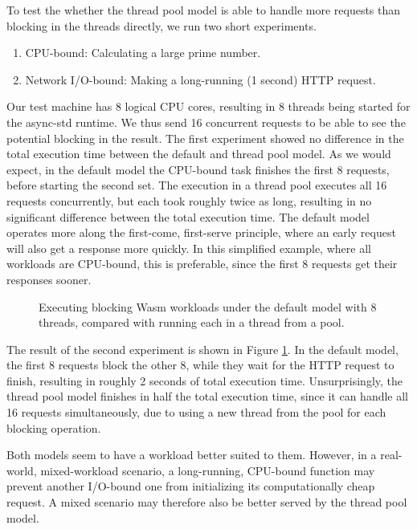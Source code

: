 To test the whether the thread pool model is able to handle more requests than blocking in the threads directly, we run two short experiments.

\begin{enumerate}
    \item CPU-bound: Calculating a large prime number.
    \item Network I/O-bound: Making a long-running (1 second) HTTP request.
\end{enumerate}

Our test machine has 8 logical CPU cores, resulting in 8 threads being started for the async-std runtime. We thus send 16 concurrent requests to be able to see the potential blocking in the result. The first experiment showed no difference in the total execution time between the default and thread pool model. As we would expect, in the default model the CPU-bound task finishes the first 8 requests, before starting the second set. The execution in a thread pool executes all 16 requests concurrently, but each took roughly twice as long, resulting in no significant difference between the total execution time. The default model operates more along the first-come, first-serve principle, where an early request will also get a response more quickly. In this simplified example, where all workloads are CPU-bound, this is preferable, since the first 8 requests get their responses sooner.

\begin{figure}[ht!]
    \begin{center}
        
    \end{center}
    \caption{Executing blocking Wasm workloads under the  default model with 8 threads, compared with running each in a thread from a pool.}
    \label{fig:default_vs_thread_pool}
\end{figure}

The result of the second experiment is shown in Figure \ref{fig:default_vs_thread_pool}. In the default model, the first 8 requests block the other 8, while they wait for the HTTP request to finish, resulting in roughly 2 seconds of total execution time. Unsurprisingly, the thread pool model finishes in half the total execution time, since it can handle all 16 requests simultaneously, due to using a new thread from the pool for each blocking operation.

Both models seem to have a workload better suited to them. However, in a real-world, mixed-workload scenario, a long-running, CPU-bound function may prevent another I/O-bound one from initializing its computationally cheap request. A mixed scenario may therefore also be better served by the thread pool model.


